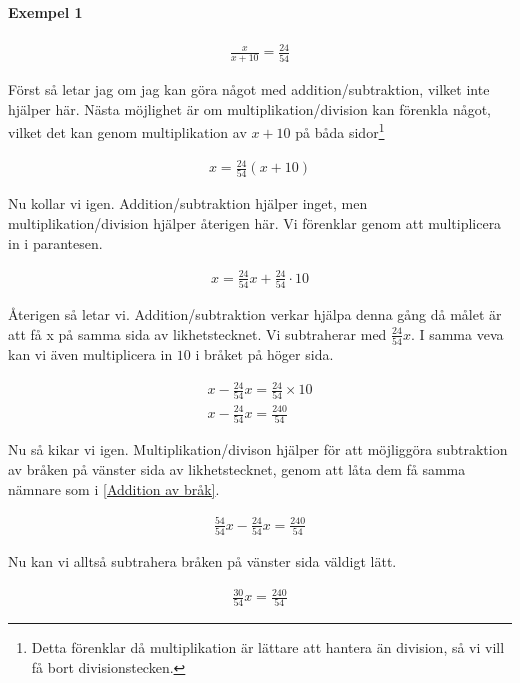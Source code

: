 \paragraph{Exempel 1}

\begin{align}
	\frac{x}{x+10} = \frac{24}{54}
\end{align}

Först så letar jag om jag kan göra något med addition/subtraktion, vilket inte hjälper här. Nästa möjlighet är om multiplikation/division kan förenkla något, vilket det kan genom multiplikation av $x+10$ på båda sidor\footnote{Detta förenklar då multiplikation är lättare att hantera än division, så vi vill få bort divisionstecken.}

\begin{align}
	x = \frac{24}{54}(x+10)
\end{align}

Nu kollar vi igen. Addition/subtraktion hjälper inget, men multiplikation/division hjälper återigen här. Vi förenklar genom att multiplicera in i parantesen.

\begin{align}
	x = \frac{24}{54}x + \frac{24}{54} \cdot 10
\end{align}

Återigen så letar vi. Addition/subtraktion verkar hjälpa denna gång då målet är att få x på samma sida av likhetstecknet. Vi subtraherar med $\frac{24}{54}x$. I samma veva kan vi även multiplicera in $10$ i bråket på höger sida.

\begin{align}
	x - \frac{24}{54}x = \frac{24}{54} \times 10 \\
	x - \frac{24}{54}x = \frac{240}{54}
\end{align}

Nu så kikar vi igen. Multiplikation/divison hjälper för att möjliggöra subtraktion av bråken på vänster sida av likhetstecknet, genom att låta dem få samma nämnare som i \ref{Addition av bråk}.

\begin{align}
	\frac{54}{54}x - \frac{24}{54}x = \frac{240}{54}
\end{align}

Nu kan vi alltså subtrahera bråken på vänster sida väldigt lätt.

\begin{align}
	\frac{30}{54}x = \frac{240}{54}
\end{align}

